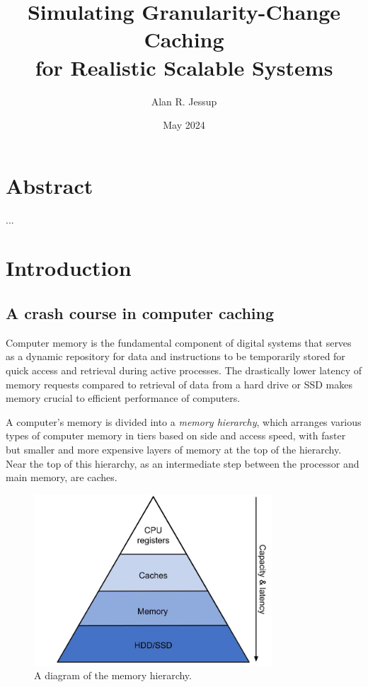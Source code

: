 \documentclass[12pt,twoside]{reedthesis}
\title{Simulating Granularity-Change Caching \\ for Realistic Scalable Systems}
\author{Alan R. Jessup}
\date{May 2024}
\begin{document}
\maketitle
\frontmatter %
\pagestyle{empty}

\tableofcontents

\chapter*{Abstract}

...

\mainmatter
\pagestyle{fancyplain}

\chapter{Introduction}

\section{A crash course in computer caching}

Computer memory is the fundamental component of digital systems that serves as a dynamic repository for data and instructions to be temporarily stored for quick access and retrieval during active processes. The drastically lower latency of memory requests compared to retrieval of data from a hard drive or SSD makes memory crucial to efficient performance of computers.

A computer's memory is divided into a \textit{memory hierarchy}, which arranges various types of computer memory in tiers based on side and access speed, with faster but smaller and more expensive layers of memory at the top of the hierarchy. Near the top of this hierarchy, as an intermediate step between the processor and main memory, are caches.

\begin{figure}[h]
    \centering
    \includegraphics[width=3.5in]{figures/mem_hierarchy.jpg}
    \caption{A diagram of the memory hierarchy.}
\end{figure}
\end{document}
